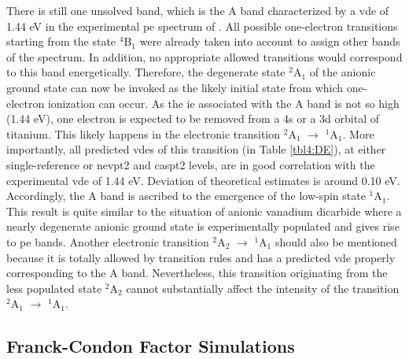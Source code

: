 \begin{refsection}
There is still one unsolved band, which is the A band characterized by a \acrshort{vde} of 1.44 eV in the experimental \acrshort{pe} spectrum of . All possible one-electron transitions starting from the state $^4$B$_1$ were already taken into account to assign other bands of the spectrum. In addition, no appropriate allowed transitions would correspond to this band energetically. Therefore, the degenerate state $^2$A$_1$ of the anionic ground state can now be invoked as the likely initial state from which one-electron ionization can occur. As the \acrshort{ie} associated with the A band is not so high (1.44 eV), one electron is expected to be removed from a 4s or a 3d orbital of titanium. This likely happens in the electronic transition $^2$A$_1$ $\longrightarrow$ $^1$A$_1$. More importantly, all predicted \acrshort{vde}s of this transition (in Table \ref{tbl4:DE}), at either single-reference or \acrshort{nevpt2} and \acrshort{caspt2} levels, are in good correlation with the experimental \acrshort{vde} of 1.44 eV. Deviation of theoretical estimates is around 0.10 eV. Accordingly, the A band is ascribed to the emergence of the low-spin state $^1$A$_1$. This result is quite similar to the situation of anionic vanadium dicarbide where a nearly degenerate anionic ground state is experimentally populated and gives rise to \acrshort{pe} bands. \cite{c4:44} Another electronic transition $^2$A$_2$ $\longrightarrow$ $^1$A$_1$ should also be mentioned because it is totally allowed by transition rules and has a predicted \acrshort{vde} properly corresponding to the A band. Nevertheless, this transition originating from the less populated state $^2$A$_2$ cannot substantially affect the intensity of the transition $^2$A$_1$ $\longrightarrow$ $^1$A$_1$.





\subsection{Franck-Condon Factor Simulations}



\end{refsection}

